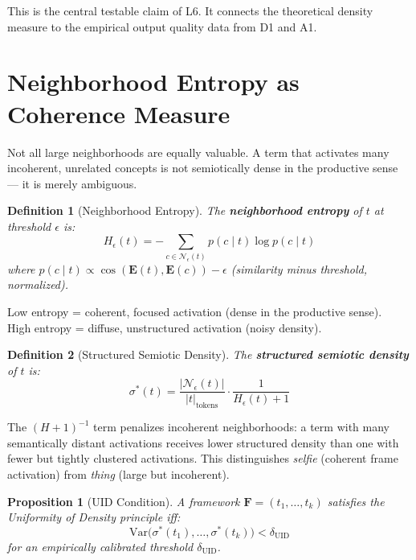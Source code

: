 \documentclass[11pt,a4paper]{article}
\newtheorem{definition}{Definition}[section]
\newtheorem{proposition}{Proposition}[section]
\begin{document}
This is the central testable claim of L6. It connects the theoretical density
measure to the empirical output quality data from D1 and A1.

\section{Neighborhood Entropy as Coherence Measure}
\label{sec:entropy}

Not all large neighborhoods are equally valuable. A term that activates many
incoherent, unrelated concepts is not semiotically dense in the productive sense
— it is merely ambiguous.

\begin{definition}[Neighborhood Entropy]
\label{def:entropy}
The \textbf{neighborhood entropy} of $t$ at threshold $\epsilon$ is:
\[
  H_\epsilon(t) = -\sum_{c \in \mathcal{N}_\epsilon(t)}
    p(c \mid t) \log p(c \mid t)
\]
where $p(c \mid t) \propto \cos(\mathbf{E}(t), \mathbf{E}(c)) - \epsilon$
(similarity minus threshold, normalized).
\end{definition}

Low entropy = coherent, focused activation (dense in the productive sense).\\
High entropy = diffuse, unstructured activation (noisy density).

\begin{definition}[Structured Semiotic Density]
\label{def:sigma-structured}
The \textbf{structured semiotic density} of $t$ is:
\[
  \sigma^*(t) = \frac{|\mathcal{N}_\epsilon(t)|}{|t|_{\text{tokens}}}
  \cdot \frac{1}{H_\epsilon(t) + 1}
\]
\end{definition}

The $(H + 1)^{-1}$ term penalizes incoherent neighborhoods: a term with many
semantically distant activations receives lower structured density than one with
fewer but tightly clustered activations. This distinguishes \textit{selfie}
(coherent frame activation) from \textit{thing} (large but incoherent).

\begin{proposition}[UID Condition]
A framework $\mathbf{F} = (t_1, \ldots, t_k)$ satisfies the
Uniformity of Density principle iff:
\[
  \text{Var}\bigl(\sigma^*(t_1), \ldots, \sigma^*(t_k)\bigr) < \delta_{\text{UID}}
\]
for an empirically calibrated threshold $\delta_{\text{UID}}$.
\end{proposition}
\end{document}
